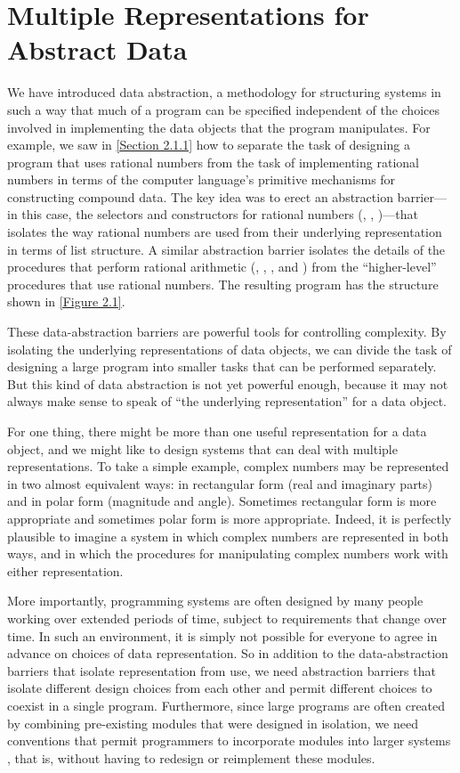 \section{Multiple Representations for Abstract Data}
\label{Section 2.4}

We have introduced data abstraction, a methodology for structuring systems in such a way that much of a program can be specified independent of the choices involved in implementing the data objects that the program manipulates.
For example, we saw in \cref{Section 2.1.1} how to separate the task of designing a program that uses rational numbers from the task of implementing rational numbers in terms of the computer language’s primitive mechanisms for constructing compound data.
The key idea was to erect an abstraction barrier---in this case, the selectors and constructors for rational numbers (, , )---that isolates the way rational numbers are used from their underlying representation in terms of list structure.
A similar abstraction barrier isolates the details of the procedures that perform rational arithmetic (, , , and ) from the “higher-level” procedures that use rational numbers.
The resulting program has the structure shown in \cref{Figure 2.1}.

These data-abstraction barriers are powerful tools for controlling complexity.
By isolating the underlying representations of data objects, we can divide the task of designing a large program into smaller tasks that can be performed separately.
But this kind of data abstraction is not yet powerful enough, because it may not always make sense to speak of “the underlying representation” for a data object.

For one thing, there might be more than one useful representation for a data object, and we might like to design systems that can deal with multiple representations.
To take a simple example, complex numbers may be represented in two almost equivalent ways:
in rectangular form (real and imaginary parts) and in polar form (magnitude and angle).
Sometimes rectangular form is more appropriate and sometimes polar form is more appropriate.
Indeed, it is perfectly plausible to imagine a system in which complex numbers are represented in both ways, and in which the procedures for manipulating complex numbers work with either representation.

More importantly, programming systems are often designed by many people working over extended periods of time, subject to requirements that change over time.
In such an environment, it is simply not possible for everyone to agree in advance on choices of data representation.
So in addition to the data-abstraction barriers that isolate representation from use, we need abstraction barriers that isolate different design choices from each other and permit different choices to coexist in a single program.
Furthermore, since large programs are often created by combining pre-existing modules that were designed in isolation, we need conventions that permit programmers to incorporate modules into larger systems , that is, without having to redesign or reimplement these modules.

